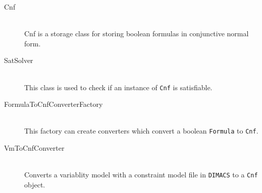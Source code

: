 \begin{description}
    \item[Cnf] \hfill \\
    Cnf is a storage class for storing boolean formulas in conjunctive normal form.
    \item[SatSolver]\hfill \\
    This class is used to check if an instance of \texttt{Cnf} is satisfiable.
    \item[FormulaToCnfConverterFactory]  \hfill \\
    This factory can create converters which convert a boolean \texttt{Formula}  to \texttt{Cnf}.
    \item[VmToCnfConverter]  \hfill \\
    Converts a variablity model with a constraint model file in \texttt{DIMACS} to a \texttt{Cnf} object.
\end{description}
